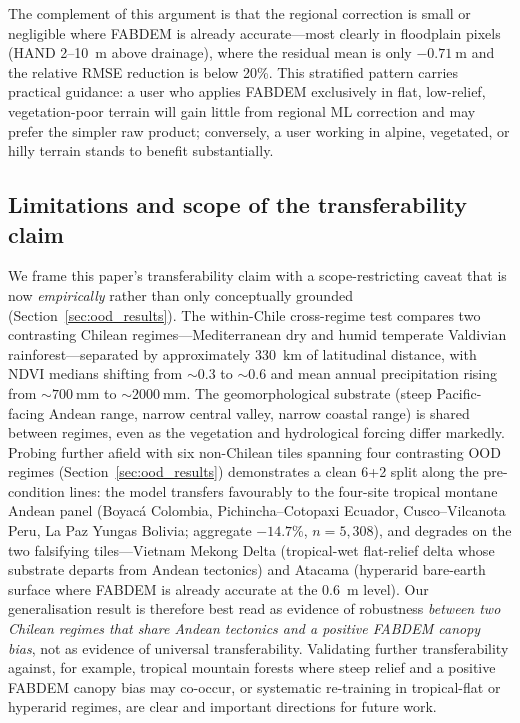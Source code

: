 \documentclass[preprint,authoryear,number]{elsarticle}
\begin{document}
The complement of this argument is that the regional correction is small or negligible where FABDEM is already accurate---most clearly in floodplain pixels (HAND 2--\SI{10}{\meter} above drainage), where the residual mean is only $-\SI{0.71}{\meter}$ and the relative RMSE reduction is below 20\%. This stratified pattern carries practical guidance: a user who applies FABDEM exclusively in flat, low-relief, vegetation-poor terrain will gain little from regional ML correction and may prefer the simpler raw product; conversely, a user working in alpine, vegetated, or hilly terrain stands to benefit substantially.

\subsection{Limitations and scope of the transferability claim}
\label{sec:limitations}

We frame this paper's transferability claim with a scope-restricting caveat that is now \emph{empirically} rather than only conceptually grounded (Section~\ref{sec:ood_results}). The within-Chile cross-regime test compares two contrasting Chilean regimes---Mediterranean dry and humid temperate Valdivian rainforest---separated by approximately \SI{330}{\kilo\meter} of latitudinal distance, with NDVI medians shifting from $\sim 0.3$ to $\sim 0.6$ and mean annual precipitation rising from $\sim \SI{700}{\milli\meter}$ to $\sim \SI{2000}{\milli\meter}$. The geomorphological substrate (steep Pacific-facing Andean range, narrow central valley, narrow coastal range) is shared between regimes, even as the vegetation and hydrological forcing differ markedly. Probing further afield with six non-Chilean tiles spanning four contrasting OOD regimes (Section~\ref{sec:ood_results}) demonstrates a clean 6+2 split along the pre-condition lines: the model transfers favourably to the four-site tropical montane Andean panel (Boyac\'a Colombia, Pichincha--Cotopaxi Ecuador, Cusco--Vilcanota Peru, La Paz Yungas Bolivia; aggregate $-14.7\%$, $n=5{,}308$), and degrades on the two falsifying tiles---Vietnam Mekong Delta (tropical-wet flat-relief delta whose substrate departs from Andean tectonics) and Atacama (hyperarid bare-earth surface where FABDEM is already accurate at the \SI{0.6}{\meter} level). Our generalisation result is therefore best read as evidence of robustness \emph{between two Chilean regimes that share Andean tectonics and a positive FABDEM canopy bias}, not as evidence of universal transferability. Validating further transferability against, for example, tropical mountain forests where steep relief and a positive FABDEM canopy bias may co-occur, or systematic re-training in tropical-flat or hyperarid regimes, are clear and important directions for future work.
\end{document}
